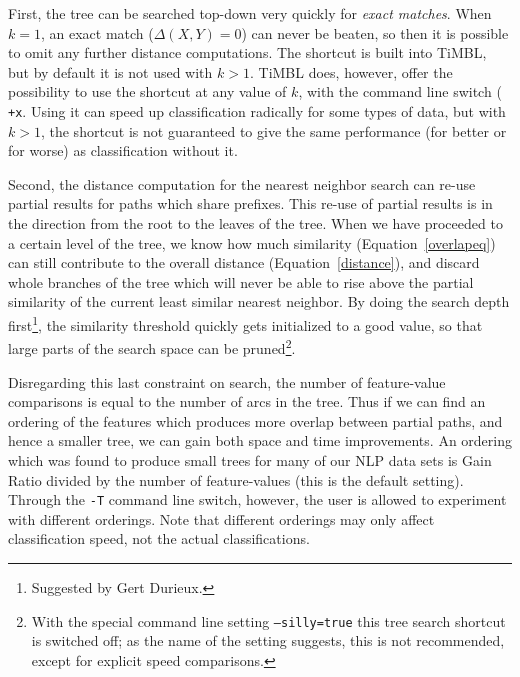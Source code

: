 \documentclass{report}
\begin{document}

First, the tree can be searched top-down very quickly for {\em exact
  matches}. When $k=1$, an exact match ($\Delta(X,Y)=0$) can never be
beaten, so then it is possible to omit any further distance
computations. The shortcut is built into TiMBL, but by default it is
not used with $k>1$. TiMBL does, however, offer the possibility to use
the shortcut at any value of $k$, with the command line switch ({\tt
  +x}. Using it can speed up classification radically for some types
of data, but with $k>1$, the shortcut is not guaranteed to give the
same performance (for better or for worse) as classification without
it.

Second, the distance computation for the nearest neighbor search can
re-use partial results for paths which share prefixes.  This re-use of
partial results is in the direction from the root to the leaves of the
tree. When we have proceeded to a certain level of the tree, we know
how much similarity (Equation~\ref{overlapeq}) can still contribute to
the overall distance (Equation~\ref{distance}), and discard whole
branches of the tree which will never be able to rise above the
partial similarity of the current least similar nearest neighbor. By
doing the search depth first\footnote{Suggested by Gert Durieux.}, the
similarity threshold quickly gets initialized to a good value, so that
large parts of the search space can be pruned\footnote{With the
  special command line setting {\tt --silly=true} this tree search shortcut
  is switched off; as the name of the setting suggests, this is not
  recommended, except for explicit speed comparisons.}.

Disregarding this last constraint on search, the number of
feature-value comparisons is equal to the number of arcs in the
tree. Thus if we can find an ordering of the features which produces
more overlap between partial paths, and hence a smaller tree, we can
gain both space and time improvements. An ordering which was found to
produce small trees for many of our NLP data sets is Gain Ratio
divided by the number of feature-values (this is the default
setting). Through the {\tt -T} command line switch, however, the user
is allowed to experiment with different orderings. Note that different
orderings may only affect classification speed, not the actual
classifications.
\end{document}
